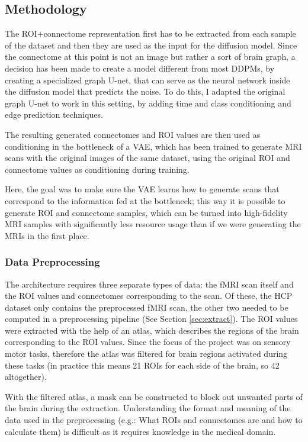 	\subsection{Methodology}
	
	The ROI+connectome representation first has to be extracted from each sample of the dataset and then they are used as the input for the diffusion model. Since the connectome at this point is not an image but rather a sort of brain graph, a decision has been made to create a model different from most DDPMs, by creating a specialized graph U-net, that can serve as the neural network inside the diffusion model that predicts the noise. To do this, I adapted the original graph U-net \cite{graph-u-net} to work in this setting, by adding time and class conditioning and edge prediction techniques.
	
	The resulting generated connectomes and ROI values are then used as conditioning in the bottleneck of a VAE, which has been trained to generate MRI scans with the original images of the same dataset, using the original ROI and connectome values as conditioning during training. 
	
	Here, the goal was to make sure the VAE learns how to generate scans that correspond to the information fed at the bottleneck; this way it is possible to generate ROI and connectome samples, which can be turned into high-fidelity MRI samples with significantly less resource usage than if we were generating the MRIs in the first place.
	
	\subsubsection{Data Preprocessing}
	
	The architecture requires three separate types of data: the fMRI scan itself and the ROI values and connectomes corresponding to the scan. Of these, the HCP dataset only contains the preprocessed fMRI scan, the other two needed to be computed in a preprocessing pipeline (See Section \ref{sec:extract}). The ROI values were extracted with the help of an atlas, which describes the regions of the brain corresponding to the ROI values. Since the focus of the project was on sensory motor tasks, therefore the atlas was filtered for brain regions activated during these tasks (in practice this means 21 ROIs for each side of the brain, so 42 altogether). 
	
	With the filtered atlas, a mask can be constructed to block out unwanted parts of the brain during the extraction. Understanding the format and meaning of the data used in the preprocessing (e.g.: What ROIs and connectomes are and how to calculate them) is difficult as it requires knowledge in the medical domain. 
	
